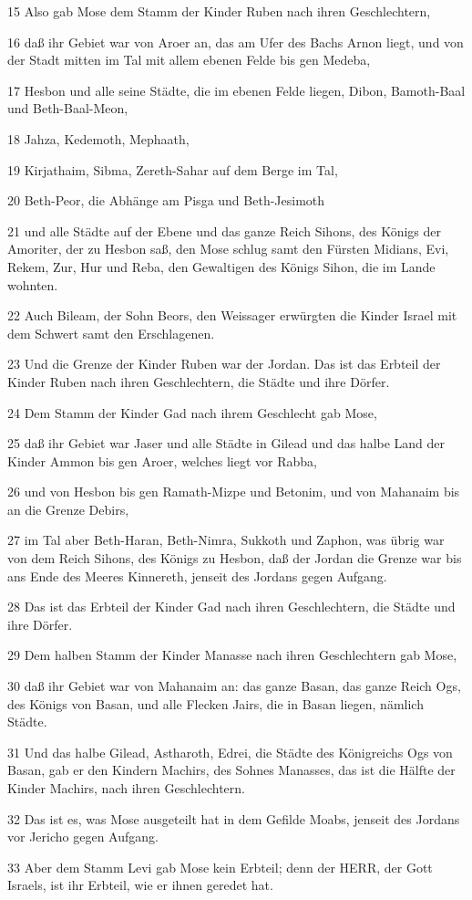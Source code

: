 \par 15 Also gab Mose dem Stamm der Kinder Ruben nach ihren Geschlechtern,
\par 16 daß ihr Gebiet war von Aroer an, das am Ufer des Bachs Arnon liegt, und von der Stadt mitten im Tal mit allem ebenen Felde bis gen Medeba,
\par 17 Hesbon und alle seine Städte, die im ebenen Felde liegen, Dibon, Bamoth-Baal und Beth-Baal-Meon,
\par 18 Jahza, Kedemoth, Mephaath,
\par 19 Kirjathaim, Sibma, Zereth-Sahar auf dem Berge im Tal,
\par 20 Beth-Peor, die Abhänge am Pisga und Beth-Jesimoth
\par 21 und alle Städte auf der Ebene und das ganze Reich Sihons, des Königs der Amoriter, der zu Hesbon saß, den Mose schlug samt den Fürsten Midians, Evi, Rekem, Zur, Hur und Reba, den Gewaltigen des Königs Sihon, die im Lande wohnten.
\par 22 Auch Bileam, der Sohn Beors, den Weissager erwürgten die Kinder Israel mit dem Schwert samt den Erschlagenen.
\par 23 Und die Grenze der Kinder Ruben war der Jordan. Das ist das Erbteil der Kinder Ruben nach ihren Geschlechtern, die Städte und ihre Dörfer.
\par 24 Dem Stamm der Kinder Gad nach ihrem Geschlecht gab Mose,
\par 25 daß ihr Gebiet war Jaser und alle Städte in Gilead und das halbe Land der Kinder Ammon bis gen Aroer, welches liegt vor Rabba,
\par 26 und von Hesbon bis gen Ramath-Mizpe und Betonim, und von Mahanaim bis an die Grenze Debirs,
\par 27 im Tal aber Beth-Haran, Beth-Nimra, Sukkoth und Zaphon, was übrig war von dem Reich Sihons, des Königs zu Hesbon, daß der Jordan die Grenze war bis ans Ende des Meeres Kinnereth, jenseit des Jordans gegen Aufgang.
\par 28 Das ist das Erbteil der Kinder Gad nach ihren Geschlechtern, die Städte und ihre Dörfer.
\par 29 Dem halben Stamm der Kinder Manasse nach ihren Geschlechtern gab Mose,
\par 30 daß ihr Gebiet war von Mahanaim an: das ganze Basan, das ganze Reich Ogs, des Königs von Basan, und alle Flecken Jairs, die in Basan liegen, nämlich Städte.
\par 31 Und das halbe Gilead, Astharoth, Edrei, die Städte des Königreichs Ogs von Basan, gab er den Kindern Machirs, des Sohnes Manasses, das ist die Hälfte der Kinder Machirs, nach ihren Geschlechtern.
\par 32 Das ist es, was Mose ausgeteilt hat in dem Gefilde Moabs, jenseit des Jordans vor Jericho gegen Aufgang.
\par 33 Aber dem Stamm Levi gab Mose kein Erbteil; denn der HERR, der Gott Israels, ist ihr Erbteil, wie er ihnen geredet hat.

